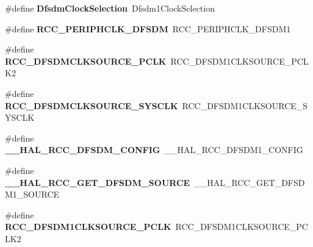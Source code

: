 \begin{DoxyCompactItemize}
\item 
\mbox{\label{group___h_a_l___r_c_c___aliased_ga245665abb7d8072ff233db26331a6648}} 
\#define {\bfseries Dfsdm\+Clock\+Selection}~Dfsdm1\+Clock\+Selection
\item 
\mbox{\label{group___h_a_l___r_c_c___aliased_ga4a97e8e6929bf5ce0a85b8a92fd5c7e6}} 
\#define {\bfseries R\+C\+C\+\_\+\+P\+E\+R\+I\+P\+H\+C\+L\+K\+\_\+\+D\+F\+S\+DM}~R\+C\+C\+\_\+\+P\+E\+R\+I\+P\+H\+C\+L\+K\+\_\+\+D\+F\+S\+D\+M1
\item 
\mbox{\label{group___h_a_l___r_c_c___aliased_ga947a134f814757c5757eef64b84cc949}} 
\#define {\bfseries R\+C\+C\+\_\+\+D\+F\+S\+D\+M\+C\+L\+K\+S\+O\+U\+R\+C\+E\+\_\+\+P\+C\+LK}~R\+C\+C\+\_\+\+D\+F\+S\+D\+M1\+C\+L\+K\+S\+O\+U\+R\+C\+E\+\_\+\+P\+C\+L\+K2
\item 
\mbox{\label{group___h_a_l___r_c_c___aliased_gad529099e8057474b7e1f86deb9519348}} 
\#define {\bfseries R\+C\+C\+\_\+\+D\+F\+S\+D\+M\+C\+L\+K\+S\+O\+U\+R\+C\+E\+\_\+\+S\+Y\+S\+C\+LK}~R\+C\+C\+\_\+\+D\+F\+S\+D\+M1\+C\+L\+K\+S\+O\+U\+R\+C\+E\+\_\+\+S\+Y\+S\+C\+LK
\item 
\mbox{\label{group___h_a_l___r_c_c___aliased_ga7539e94e5f9445ea0cb18f8fae72579e}} 
\#define {\bfseries \+\_\+\+\_\+\+H\+A\+L\+\_\+\+R\+C\+C\+\_\+\+D\+F\+S\+D\+M\+\_\+\+C\+O\+N\+F\+IG}~\+\_\+\+\_\+\+H\+A\+L\+\_\+\+R\+C\+C\+\_\+\+D\+F\+S\+D\+M1\+\_\+\+C\+O\+N\+F\+IG
\item 
\mbox{\label{group___h_a_l___r_c_c___aliased_gad4a161eff1e0026f34cee8c33eff569b}} 
\#define {\bfseries \+\_\+\+\_\+\+H\+A\+L\+\_\+\+R\+C\+C\+\_\+\+G\+E\+T\+\_\+\+D\+F\+S\+D\+M\+\_\+\+S\+O\+U\+R\+CE}~\+\_\+\+\_\+\+H\+A\+L\+\_\+\+R\+C\+C\+\_\+\+G\+E\+T\+\_\+\+D\+F\+S\+D\+M1\+\_\+\+S\+O\+U\+R\+CE
\item 
\mbox{\label{group___h_a_l___r_c_c___aliased_ga955619c85104217f8403b5efdff9e3e6}} 
\#define {\bfseries R\+C\+C\+\_\+\+D\+F\+S\+D\+M1\+C\+L\+K\+S\+O\+U\+R\+C\+E\+\_\+\+P\+C\+LK}~R\+C\+C\+\_\+\+D\+F\+S\+D\+M1\+C\+L\+K\+S\+O\+U\+R\+C\+E\+\_\+\+P\+C\+L\+K2
\item 

\end{DoxyCompactItemize}
